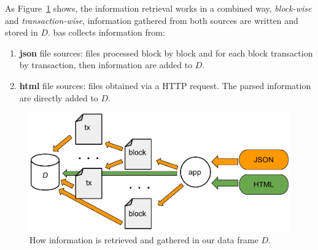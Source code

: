 \documentclass[USenglish]{uit-thesis}
\begin{document}
As Figure~\ref{fig:retrieval_scheme} shows,
the information retrieval works
in a combined way, \emph{block-wise}
and \emph{transaction-wise},
information gathered from both sources are
written and stored in $D$. \gls{bas}
collects information from:
\begin{enumerate}[noitemsep]
	\item \textbf{\gls{json}} file sources: files processed block by block and
	for each block transaction by transaction, then information are added to $D$.
	\item \textbf{\gls{html}} file sources: files obtained via a HTTP request. The parsed information are directly added to $D$.
	
\end{enumerate}
\begin{figure}[h]
	\centering
	\includegraphics[width=1\textwidth]{img/retrieval_scheme}
	\caption{How information is retrieved and gathered in our data frame $D$.}
	\label{fig:retrieval_scheme}
\end{figure}
\end{document}
